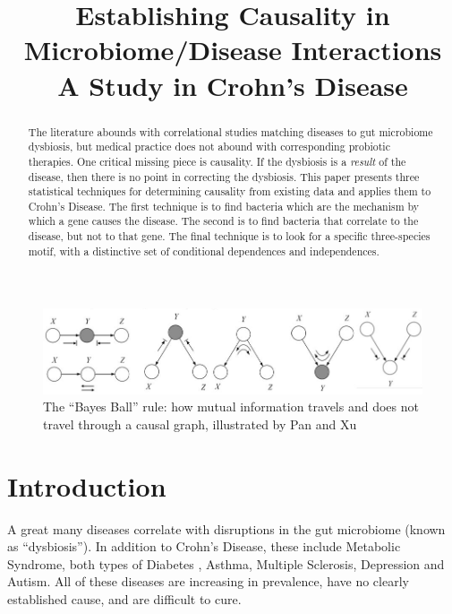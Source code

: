 \documentclass[a4paper]{article}
\title{Establishing Causality in Microbiome/Disease Interactions\\A
  Study in Crohn's Disease}
\begin{document}
\ninept

    \maketitle

\begin{abstract}
The literature abounds with correlational studies matching diseases to
gut microbiome dysbiosis, but medical practice does not abound with
corresponding probiotic therapies.  One critical missing piece is
causality.  If the dysbiosis is a \textit{result} of the disease,
then there is no point in correcting the dysbiosis.  This paper 
presents three statistical techniques for determining causality from
existing data and applies them to Crohn's Disease.  The first technique
is to find bacteria which are the mechanism by which a gene causes the
disease.  The second is to find bacteria that correlate to the
disease, but not to that gene.  The final technique is to look for a
specific three-species motif, with a distinctive set of conditional
dependences and independences.
\end{abstract}

\begin{figure}[t]
  \includegraphics[width=\textwidth]{bayesball}
  \caption{The ``Bayes Ball'' rule: how mutual information travels and
  does not travel through a causal graph, illustrated by Pan and
  Xu\cite{bayesball} }
\end{figure}

\section{Introduction}

A great many diseases correlate with disruptions in the gut microbiome
(known as “dysbiosis”).  In addition to Crohn's Disease, these include
Metabolic Syndrome, both types of Diabetes \cite{obesity}, Asthma, Multiple
Sclerosis\cite{autoim}, Depression and Autism\cite{cns}.  All of these diseases are
increasing in prevalence, have no clearly established cause, and are
difficult to cure.
\end{document}
